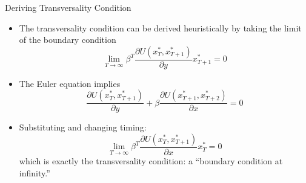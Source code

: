 \documentclass[9pt,aspectratio=169]{beamer}
\begin{document}
\begin{frame}{Deriving Transversality Condition}
    \begin{itemize}
        \item The transversality condition can be derived heuristically by
        taking the limit of the boundary condition
    \begin{equation*}
        \lim_{T \to \infty} \beta^T \frac{\partial U(x^*_T,
          x^*_{T+1})}{\partial y} x^*_{T+1} = 0
    \end{equation*}
    \item The Euler equation implies
    \begin{equation*}
        \frac{\partial U(x^*_T, x^*_{T+1})}{\partial y} + \beta
        \frac{\partial U(x^*_{T+1}, x^*_{T+2})}{\partial x} = 0
    \end{equation*}
    \item Substituting and changing timing:
    \begin{equation*}
        \lim_{T \to \infty} \beta^T \frac{\partial U(x^*_T, x^*_{T+1})}{\partial x} x^*_T = 0
    \end{equation*}
    which is exactly the transversality condition: a ``boundary condition at
    infinity.''
    \end{itemize}
\end{frame}
\end{document}

